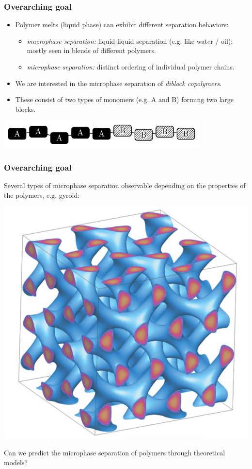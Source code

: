 \begin{frame}[t]
    \frametitle{Overarching goal}

    \vfill

    \begin{itemize}
        \item Polymer melts (liquid phase) can exhibit different separation behaviors:
        \begin{itemize}
            \item \emph{macrophase separation:} liquid-liquid separation (e.g. like water / oil); mostly seen in blends of different polymers.
            \item \emph{microphase separation:} distinct ordering of individual polymer chains.
        \end{itemize}
        \item We are interested in the microphase separation of \emph{diblock copolymers}.
        \item These consist of two types of monomers (e.g. A and B) forming two large blocks.
    \end{itemize}

    \centering
    \includegraphics[width=0.8\textwidth]{figures/copoly2.pdf}
\end{frame}

\begin{frame}[t]
    \frametitle{Overarching goal}

    Several types of microphase separation observable depending on the properties of the polymers, e.g. gyroid:

    \centering
    \includegraphics[scale=0.15]{figures/gyroid_separation.png}

    Can we predict the microphase separation of polymers through theoretical models?
\end{frame}

